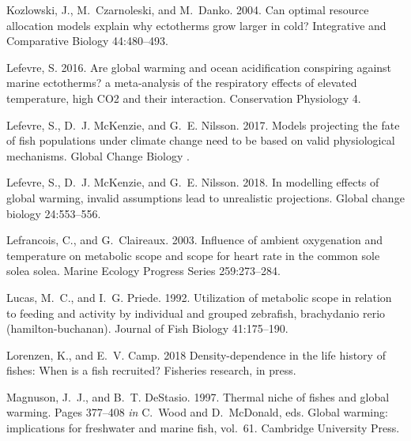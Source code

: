 \documentclass[11pt]{article}\usepackage[]{graphicx}\usepackage[]{color,soul}
\begin{document}
\begin{thebibliography}{55}
Kozlowski, J., M.~Czarnoleski, and M.~Danko. 2004.
\newblock Can optimal resource allocation models explain why ectotherms grow
  larger in cold?
\newblock Integrative and Comparative Biology 44:480--493.

Lefevre, S. 2016.
\newblock Are global warming and ocean acidification conspiring against marine
  ectotherms? a meta-analysis of the respiratory effects of elevated
  temperature, high {CO}2 and their interaction.
\newblock Conservation Physiology 4.

Lefevre, S., D.~J. {McKenzie}, and G.~E. Nilsson. 2017.
\newblock Models projecting the fate of fish populations under climate change
  need to be based on valid physiological mechanisms.
\newblock Global Change Biology .

Lefevre, S., D.~J. McKenzie, and G.~E. Nilsson. 2018.
\newblock In modelling effects of global warming, invalid assumptions lead to
  unrealistic projections.
\newblock Global change biology 24:553--556.

Lefrancois, C., and G.~Claireaux. 2003.
\newblock Influence of ambient oxygenation and temperature on metabolic scope
  and scope for heart rate in the common sole solea solea.
\newblock Marine Ecology Progress Series 259:273--284.

Lucas, M.~C., and I.~G. Priede. 1992.
\newblock Utilization of metabolic scope in relation to feeding and activity by
  individual and grouped zebrafish, brachydanio rerio (hamilton-buchanan).
\newblock Journal of Fish Biology 41:175--190.

Lorenzen, K., and E.~V. Camp. 2018
\newblock Density-dependence in the life history of fishes: When is a fish
  recruited? 
\newblock Fisheries research, in press.

Magnuson, J.~J., and B.~T. {DeStasio}. 1997.
\newblock Thermal niche of fishes and global warming.
\newblock Pages 377--408 \emph{in} C.~Wood and D.~{McDonald}, eds. Global
  warming: implications for freshwater and marine fish, vol.~61. Cambridge
  University Press.


\end{thebibliography}
\end{document}
